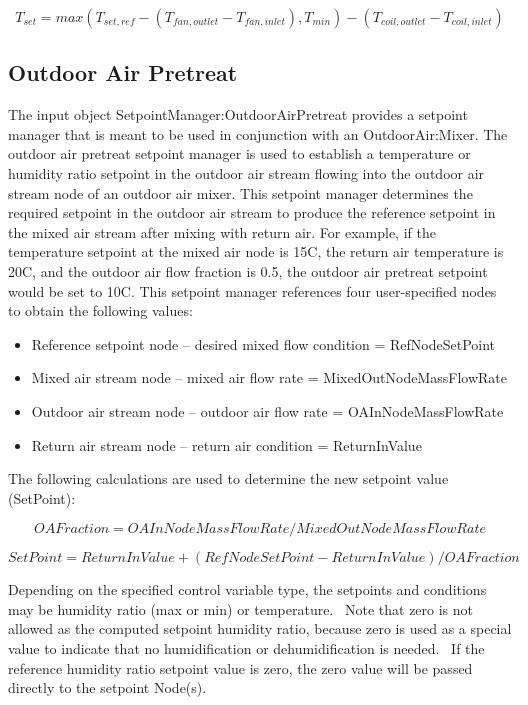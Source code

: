 \begin{equation}
{T_{set}} = max(T_{set,ref} - ({T_{fan,outlet}} - {T_{fan,inlet}}), T_{min}) - ({T_{coil,outlet}} - {T_{coil,inlet}})
\end{equation}

\subsection{Outdoor Air Pretreat}\label{outdoor-air-pretreat}

The input object SetpointManager:OutdoorAirPretreat provides a setpoint manager that is meant to be used in conjunction with an OutdoorAir:Mixer. The outdoor air pretreat setpoint manager is used to establish a temperature or humidity ratio setpoint in the outdoor air stream flowing into the outdoor air stream node of an outdoor air mixer. This setpoint manager determines the required setpoint in the outdoor air stream to produce the reference setpoint in the mixed air stream after mixing with return air. For example, if the temperature setpoint at the mixed air node is 15C, the return air temperature is 20C, and the outdoor air flow fraction is 0.5, the outdoor air pretreat setpoint would be set to 10C. This setpoint manager references four user-specified nodes to obtain the following values:

\begin{itemize}
\item Reference setpoint node -- desired mixed flow condition = RefNodeSetPoint
\item Mixed air stream node -- mixed air flow rate = MixedOutNodeMassFlowRate
\item Outdoor air stream node -- outdoor air flow rate = OAInNodeMassFlowRate
\item Return air stream node -- return air condition = ReturnInValue
\end{itemize}

The following calculations are used to determine the new setpoint value (SetPoint):

\begin{equation}
OAFraction = OAInNodeMassFlowRate / MixedOutNodeMassFlowRate
\end{equation}

\begin{equation}
SetPoint = ReturnInValue + (RefNodeSetPoint - ReturnInValue)/OAFraction
\end{equation}

Depending on the specified control variable type, the setpoints and conditions may be humidity ratio (max or min) or temperature.~ Note that zero is not allowed as the computed setpoint humidity ratio, because zero is used as a special value to indicate that no humidification or dehumidification is needed.~ If the reference humidity ratio setpoint value is zero, the zero value will be passed directly to the setpoint Node(s).

